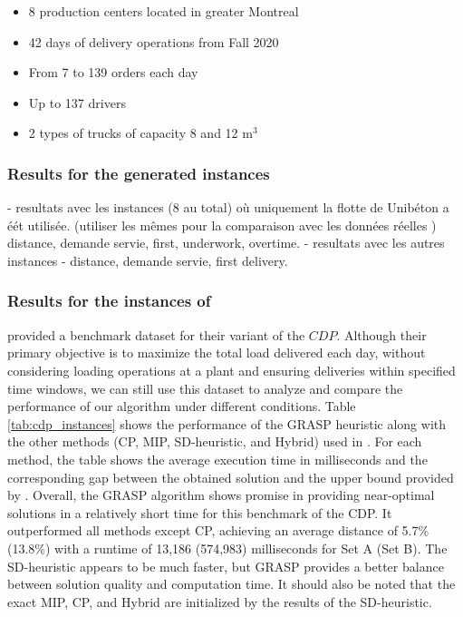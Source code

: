 \documentclass{article}
\begin{document}


\begin{itemize}
    \item   8 production centers located in greater Montreal
    \item   42 days of delivery operations from Fall 2020
    \item   From 7 to 139 orders each day
    \item   Up to 137 drivers
    \item   2 types of trucks of capacity 8 and 12 m$^3$
\end{itemize}

\subsubsection{ Results for the generated instances}

- resultats avec les instances (8 au total) où uniquement la flotte de Unibéton a éét utilisée. (utiliser les mêmes pour la comparaison avec les données réelles )
distance, demande servie, first, underwork, overtime.
- resultats avec les autres instances
- distance, demande servie, first delivery.




\subsubsection{ Results for the instances of \cite{kinable2014concrete}}

\cite{kinable2014concrete} provided a benchmark dataset for their variant of the $CDP$. Although their primary objective is to maximize the total load delivered each day, without considering loading operations at a plant and ensuring deliveries within specified time windows, we can still use this dataset to analyze and compare the performance of our algorithm under different conditions. Table \ref*{tab:cdp_instances} shows the performance of the GRASP heuristic along with the other methods (CP, MIP, SD-heuristic, and Hybrid) used in \cite{kinable2014concrete}.  For each method, the table shows the average execution time in milliseconds and the corresponding gap between the obtained solution and the upper bound provided by \cite{kinable2014concrete}.  Overall, the GRASP algorithm shows promise in providing near-optimal solutions in a relatively short time for this benchmark of the CDP. It outperformed all methods except CP, achieving an average distance of 5.7\% (13.8\%) with a runtime of 13,186 (574,983) milliseconds for Set A (Set B). The SD-heuristic appears to be much faster, but GRASP provides a better balance between solution quality and computation time. It should also be noted that the exact MIP, CP, and Hybrid are initialized by the results of the SD-heuristic.
\end{document}
